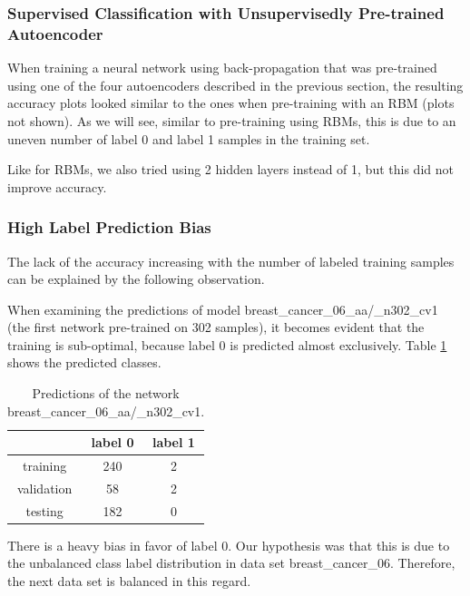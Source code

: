 \subsubsection{Supervised Classification with Unsupervisedly Pre-trained Autoencoder}

When
training a neural network using back-propagation that was pre-trained
using one of the four autoencoders described in the previous section,
the resulting accuracy plots looked similar to the ones when pre-training
with an RBM (plots not shown). As we will see, similar to pre-training
using RBMs, this is due to an uneven number of label 0 and label 1
samples in the training set.

Like for RBMs, we also tried using 2 hidden layers instead of 1, but
this did not improve accuracy.

\subsubsection{High Label Prediction Bias\label{par:Examining-biased-classifier}}

The
lack of the accuracy increasing with the number of labeled training
samples can be explained by the following observation.

When examining the predictions of model breast\_cancer\_06\_aa/\_n302\_cv1
(the first network pre-trained on 302 samples), it becomes evident
that the training is sub-optimal, because label 0 is predicted almost
exclusively.  Table \ref{tab:predictions-of-breast_cancer_06_aa/_n302_cv1}
shows the predicted classes. 
\begin{table}
\begin{centering}
\begin{tabular}{|c|c|c|}
\hline 
 & label 0 & label 1\tabularnewline
\hline 
\hline 
training & 240 & 2\tabularnewline
\hline 
validation & 58 & 2\tabularnewline
\hline 
testing & 182 & 0\tabularnewline
\hline 
\end{tabular}
\par\end{centering}
\caption{\label{tab:predictions-of-breast_cancer_06_aa/_n302_cv1}Predictions
of the network breast\_cancer\_06\_aa/\_n302\_cv1.}
\end{table}

There is a heavy bias in favor of label 0. Our hypothesis was that
this is due to the unbalanced class label distribution in data set
breast\_cancer\_06. Therefore, the next data set is balanced in this
regard.

